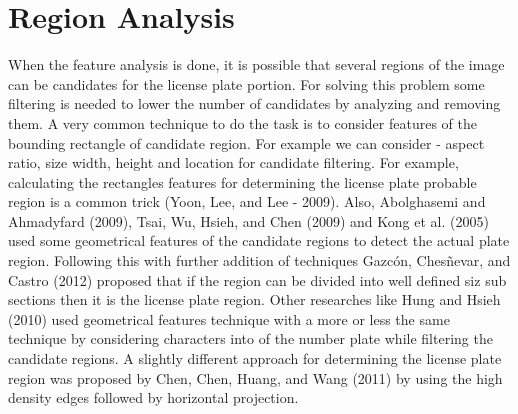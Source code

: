 \section{Region Analysis}

When the feature analysis is done, it is possible that several regions of the image can be candidates for the license plate portion. For solving this problem some filtering is needed to lower the number of candidates by analyzing and removing them. A very common technique to do the task is to consider features of the bounding rectangle of candidate region. For example we can consider - aspect ratio, size width, height and location for candidate filtering. For example, calculating the rectangles features for determining the license plate probable region is a common trick (Yoon,
Lee, and Lee - 2009). Also, Abolghasemi and Ahmadyfard (2009), Tsai, Wu,
Hsieh, and Chen (2009) and Kong et al. (2005) used some geometrical features of the candidate
regions to detect the actual plate region. Following this with
further addition of techniques Gazcón, Chesñevar, and Castro (2012) proposed that if the region can be divided into well defined siz sub sections then it is the license plate region. Other researches like Hung and Hsieh (2010) used geometrical features technique
with a more or less the same technique by considering characters into
of the number plate while filtering the candidate regions. A slightly different approach for determining the license plate region was proposed by Chen, Chen, Huang, and Wang
(2011) by using the high density edges followed by horizontal projection.
